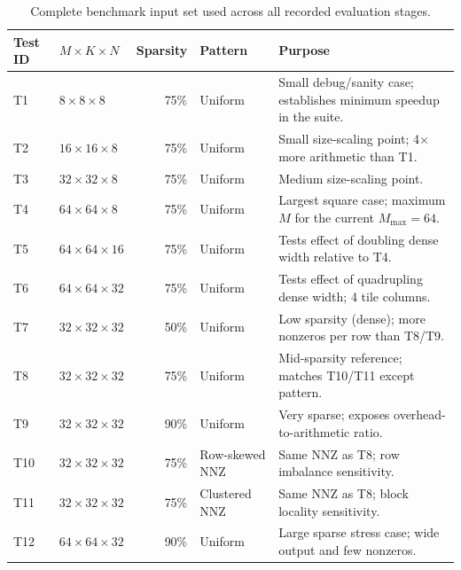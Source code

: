 \begin{table}[htbp]
  \centering
  \scriptsize
  \setlength{\tabcolsep}{9pt}
  \renewcommand{\arraystretch}{1.8} %
  \begin{tabular}{llrp{2.6cm}p{5.4cm}}
  \toprule
  Test ID & $M \times K \times N$ & Sparsity & Pattern & Purpose \\
  \midrule
  T1  & $8 \times 8 \times 8$    & 75\% & Uniform &
    Small debug/sanity case; establishes minimum speedup in the suite. \\
  T2  & $16 \times 16 \times 8$  & 75\% & Uniform &
    Small size-scaling point; 4$\times$ more arithmetic than T1. \\
  T3  & $32 \times 32 \times 8$  & 75\% & Uniform &
    Medium size-scaling point. \\
  T4  & $64 \times 64 \times 8$  & 75\% & Uniform &
    Largest square case; maximum $M$ for the current $M_{\max} = 64$. \\
  T5  & $64 \times 64 \times 16$ & 75\% & Uniform &
    Tests effect of doubling dense width relative to T4. \\
  T6  & $64 \times 64 \times 32$ & 75\% & Uniform &
    Tests effect of quadrupling dense width; 4 tile columns. \\
  T7  & $32 \times 32 \times 32$ & 50\% & Uniform &
    Low sparsity (dense); more nonzeros per row than T8/T9. \\
  T8  & $32 \times 32 \times 32$ & 75\% & Uniform &
    Mid-sparsity reference; matches T10/T11 except pattern. \\
  T9  & $32 \times 32 \times 32$ & 90\% & Uniform &
    Very sparse; exposes overhead-to-arithmetic ratio. \\
  T10 & $32 \times 32 \times 32$ & 75\% & Row-skewed NNZ &
    Same NNZ as T8; row imbalance sensitivity. \\
  T11 & $32 \times 32 \times 32$ & 75\% & Clustered NNZ &
    Same NNZ as T8; block locality sensitivity. \\
  T12 & $64 \times 64 \times 32$ & 90\% & Uniform &
    Large sparse stress case; wide output and few nonzeros. \\
  \bottomrule
  \end{tabular}
  \caption{Complete benchmark input set used across all recorded
           evaluation stages.}
  \label{tab:benchmark-inputs}
\end{table}

\vspace{1cm}

